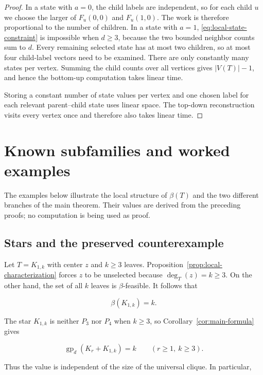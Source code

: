 \documentclass[11pt,a4paper]{article}
\numberwithin{equation}{section}
\begin{document}
\begin{proof}
In a state with \(a=0\), the child labels are
independent, so for each child \(u\) we choose the larger of
\(F_u(0,0)\) and \(F_u(1,0)\). The work is therefore proportional to the
number of children. In a state with \(a=1\), \eqref{eq:local-state-constraint} is impossible when
\(d\ge 3\), because the two bounded neighbor counts sum to \(d\). Every
remaining selected state has at most two children, so at most four
child-label vectors need to be examined. There are only constantly many
states per vertex. Summing the child counts over all vertices gives
\(|V(T)|-1\), and hence the bottom-up computation takes linear time.

Storing a constant number of state values per vertex and one chosen
label for each relevant parent--child state uses linear space. The
top-down reconstruction visits every vertex once and therefore also
takes linear time.
\end{proof}

\section{Known subfamilies and worked examples}\label{sec:examples}

The examples below illustrate the local structure of \(\beta(T)\) and
the two different branches of the main theorem. Their values are derived
from the preceding proofs; no computation is being used as proof.

\subsection{Stars and the preserved counterexample}\label{sec:stars}

Let \(T=K_{1,k}\) with center \(z\) and \(k\ge 3\) leaves.
Proposition~\ref{prop:local-characterization} forces \(z\) to be
unselected because \(\deg_T(z)=k\ge 3\). On the
other hand, the set of all \(k\) leaves is \(\beta\)-feasible. It
follows that

\[
\beta(K_{1,k})=k.
\]

The star \(K_{1,k}\) is neither \(P_3\) nor \(P_4\) when \(k\ge 3\), so
Corollary~\ref{cor:main-formula} gives

\begin{equation}\label{eq:star-family}
\operatorname{gp}_d(K_r+K_{1,k})=k
\qquad (r\ge 1,\ k\ge 3).
\end{equation}

Thus the value is independent of the size of the universal clique. In
particular,
\end{document}
